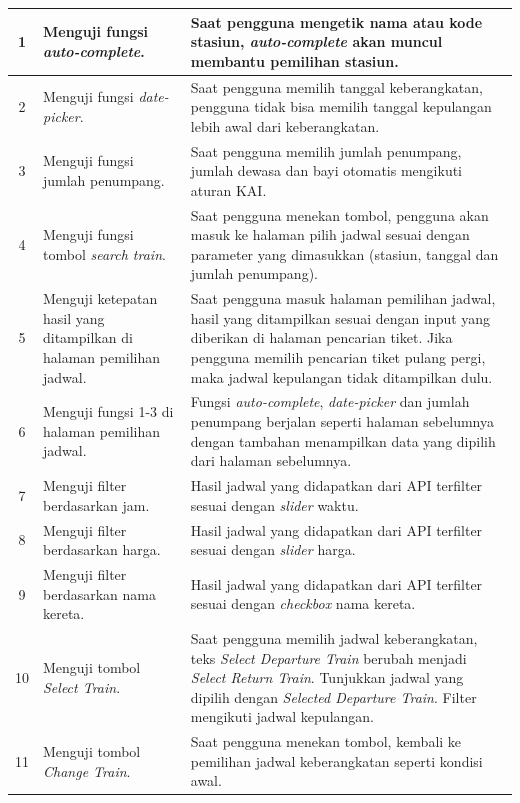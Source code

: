 \begin{longtable}[c]{|c|p{3cm}|p{8cm}|}
		\hline
        1 & Menguji fungsi \textit{auto-complete}. & Saat pengguna mengetik nama atau kode stasiun, \textit{auto-complete} akan muncul membantu pemilihan stasiun.\\
        \hline
        2 & Menguji fungsi \textit{date-picker}. & Saat pengguna memilih tanggal keberangkatan, pengguna tidak bisa memilih tanggal kepulangan lebih awal dari keberangkatan.\\
        \hline
        3 & Menguji fungsi jumlah penumpang. & Saat pengguna memilih jumlah penumpang, jumlah dewasa dan bayi otomatis mengikuti aturan KAI.\\
        \hline
        4 & Menguji fungsi tombol \textit{search train}. & Saat pengguna menekan tombol, pengguna akan masuk ke halaman pilih jadwal sesuai dengan parameter yang dimasukkan (stasiun, tanggal dan jumlah penumpang).\\
        \hline
        5 & Menguji ketepatan hasil yang ditampilkan di halaman pemilihan jadwal. & Saat pengguna masuk halaman pemilihan jadwal, hasil yang ditampilkan sesuai dengan input yang diberikan di halaman pencarian tiket. Jika pengguna memilih pencarian tiket pulang pergi, maka jadwal kepulangan tidak ditampilkan dulu.\\
        \hline
        6 & Menguji fungsi 1-3 di halaman pemilihan jadwal. & Fungsi \textit{auto-complete}, \textit{date-picker} dan jumlah penumpang berjalan seperti halaman sebelumnya dengan tambahan menampilkan data yang dipilih dari halaman sebelumnya.\\
        \hline
        7 & Menguji filter berdasarkan jam. & Hasil jadwal yang didapatkan dari API terfilter sesuai dengan \textit{slider} waktu.\\
        \hline
        8 & Menguji filter berdasarkan harga. & Hasil jadwal yang didapatkan dari API terfilter sesuai dengan \textit{slider} harga.\\
        \hline
        9 & Menguji filter berdasarkan nama kereta. & Hasil jadwal yang didapatkan dari API terfilter sesuai dengan \textit{checkbox} nama kereta.\\
        \hline
        10 & Menguji tombol \textit{Select Train}. & Saat pengguna memilih jadwal keberangkatan, teks \textit{Select Departure Train} berubah menjadi \textit{Select Return Train}. Tunjukkan jadwal yang dipilih dengan \textit{Selected Departure Train}. Filter mengikuti jadwal kepulangan.\\
        \hline
        11 & Menguji tombol \textit{Change Train}. & Saat pengguna menekan tombol, kembali ke pemilihan jadwal keberangkatan seperti kondisi awal.\\

\end{longtable}
